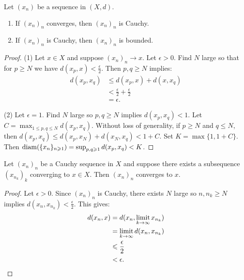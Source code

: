     \begin{proposition}
        Let $(x_n)$ be a sequence in $(X,d)$.
        \begin{enumerate}[label = (\arabic*),itemsep=1pt,topsep=3pt]
            \item If $(x_n)_n$ converges, then $(x_n)_n$ is Cauchy.
            \item If $(x_n)_n$ is Cauchy, then $(x_n)_n$ is bounded.
        \end{enumerate}
    \end{proposition}
        \begin{proof}
            (1) Let $x \in X$ and suppose $(x_n)_n \rightarrow x$. Let $\epsilon > 0$. Find $N$ large so that for $p \geq N$ we have $d(x_p,x) < \frac{\epsilon}{2}$. Then $p,q \geq N$ implies:
                \begin{equation*}
                \begin{split}
                    d(x_p,x_q) 
                    & \leq d(x_p,x) + d(x,x_q) \\
                    & < \frac{\epsilon}{2} + \frac{\epsilon}{2} \\
                    & = \epsilon.
                \end{split}
                \end{equation*}

            (2) Let $\epsilon = 1$. Find $N$ large so $p,q \geq N$ implies $d(x_p,x_q) < 1$. Let $C = \max_{1 \leq p,q \leq N}d(x_p,x_q)$. Without loss of generality, if $p \geq N $ and $q \leq N$, then $d(x_p,x_q) \leq d(x_p,x_N) + d(x_N,x_q) < 1 + C$. Set $K = \max\{1,1+C\}$. Then $\operatorname{diam}(\{x_n\}_{n \geqslant 1}) = \sup_{p,q \geqslant 1}d(x_p,x_q) < K$.
        \end{proof}

    \begin{proposition}
        Let $(x_n)_n$ be a Cauchy sequence in $X$ and suppose there exists a subsequence $(x_{n_k})_k$ converging to $x \in X$. Then $(x_n)_n$ converges to $x$.
    \end{proposition}
        \begin{proof}
            Let $\epsilon > 0$. Since $(x_n)_n$ is Cauchy, there exists $N$ large so $n,n_k \geq N$ implies $d(x_n,x_{n_k}) < \frac{\epsilon}{2}$. This gives:
                \begin{equation*}
                \begin{split}
                    d(x_n,x) 
                    & = d(x_n,\operatorname*{limit}_{k \rightarrow \infty}x_{n_k}) \\
                    & = \operatorname*{limit}_{k \rightarrow \infty} d(x_n,x_{n_k}) \\
                    & \leqslant \frac{\epsilon}{2} \\
                    & < \epsilon. \qedhere
                \end{split}
                \end{equation*}
        \end{proof}

